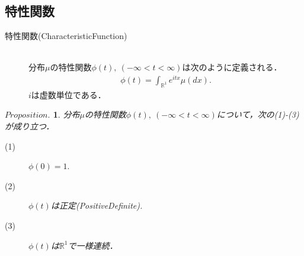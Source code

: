 \documentclass[a4j,papersize,disablejfam,slide,14pt]{jsarticle}
\newtheorem{Prop}{$Proposition.$}
\def\exp#1{e^{#1}} %
\begin{document}
\subsection{特性関数}
    \begin{screen}
    	\begin{description}
        	\item[特性関数({\rm Characteristic\quad Function})]\mbox{}\\
            	分布$\mu$の特性関数$\phi(t),\ (-\infty < t < \infty)$は次のように定義される．
                \begin{align}
            		\phi(t) = \int_{\mathbb{R}^1} \exp{itx} \mu(dx).
                \end{align}
                $i$は虚数単位である．
        \end{description}
    \end{screen}
    \begin{screen}
    	\begin{Prop}
        	分布$\mu$の特性関数$\phi(t),\ (-\infty < t < \infty)$について，次の(1)-(3)が成り立つ．
            \begin{description}
            	\item[(1)] $\phi(0) = 1.$
            	\item[(2)] $\phi(t)$は正定({\rm Positive\quad Definite}).
            	\item[(3)] $\phi(t)$は$\mathbb{R}^1$で一様連続．
            \end{description}
        \end{Prop}
    \end{screen}
\end{document}
